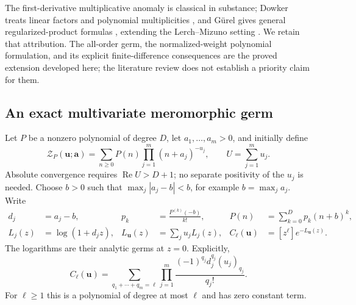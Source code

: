 \documentclass[11pt,letterpaper]{article}
\numberwithin{equation}{section}
\theoremstyle{plain}
\theoremstyle{definition}
\theoremstyle{remark}
\DeclareMathOperator{\Rea}{Re}
\newcommand{\cZ}{\mathcal Z}
\begin{document}
The first-derivative multiplicative anomaly is classical in substance;
Dowker treats linear factors and polynomial multiplicities
\cite{dowker}, and G\"urel gives general regularized-product formulas
\cite{gurel}, extending the Lerch--Mizuno setting \cite{mizuno}.
We retain that attribution. The all-order germ, the normalized-weight
polynomial formulation, and its explicit finite-difference consequences
are the proved extension developed here; the literature review does not
establish a priority claim for them.

\subsection{An exact multivariate meromorphic germ}

Let $P$ be a nonzero polynomial of degree $D$, let
$a_1,\ldots,a_m>0$, and initially define
\begin{equation}\label{sp:def}
 \cZ_P(\boldsymbol u;\boldsymbol a)
  =\sum_{n\ge0}P(n)\prod_{j=1}^m(n+a_j)^{-u_j},
 \qquad U=\sum_{j=1}^m u_j.
\end{equation}
Absolute convergence requires $\Rea U>D+1$; no separate positivity of
the $u_j$ is needed. Choose $b>0$ such that
$\max_j|a_j-b|<b$, for example $b=\max_j a_j$. Write
\begin{align}
 d_j&=a_j-b,& p_k&=\frac{P^{(k)}(-b)}{k!},&
 P(n)&=\sum_{k=0}^D p_k(n+b)^k,\label{sp:base}\\
 L_j(z)&=\log(1+d_jz),&
 L_{\boldsymbol u}(z)&=\sum_j u_jL_j(z),&
 C_\ell(\boldsymbol u)&=[z^\ell]e^{-L_{\boldsymbol u}(z)}.
 \label{sp:C}
\end{align}
The logarithms are their analytic germs at $z=0$. Explicitly,
\begin{equation}\label{sp:Cpoch}
 C_\ell(\boldsymbol u)=
 \sum_{q_1+\cdots+q_m=\ell}
       \prod_{j=1}^m\frac{(-1)^{q_j}d_j^{q_j}(u_j)_{q_j}}{q_j!}.
\end{equation}
For $\ell\ge1$ this is a polynomial of degree at most $\ell$ and has
zero constant term.
\end{document}
